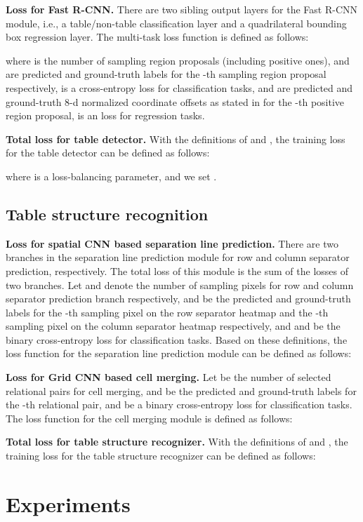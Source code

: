 \documentclass[final,3p,times,twocolumn]{elsarticle}
\begin{document}
\textbf{Loss for Fast R-CNN.} There are two sibling output layers for the Fast R-CNN module, i.e., a table/non-table classification layer and a quadrilateral bounding box regression layer. The multi-task loss function is defined as follows: 

where  is the number of sampling region proposals (including  positive ones),  and  are predicted and ground-truth labels for the -th sampling region proposal respectively,  is a cross-entropy loss for classification tasks,  and  are predicted and ground-truth 8-d normalized coordinate offsets as stated in \cite{zhong2019anchor} for the -th positive region proposal,  is an  loss for regression tasks.

\textbf{Total loss for table detector.} With the definitions of  and , the training loss for the table detector can be defined as follows:

where  is a loss-balancing parameter, and we set .

\subsection{Table structure recognition}
\textbf{Loss for spatial CNN based separation line prediction.} There are two branches in the separation line prediction module for row and column separator prediction, respectively. The total loss of this module is the sum of the losses of two branches. Let  and  denote the number of sampling pixels for row and column separator prediction branch respectively,  and  be the predicted and ground-truth labels for the -th sampling pixel on the row separator heatmap and the -th sampling pixel on the column separator heatmap respectively, and  and  be the binary cross-entropy loss for classification tasks. Based on these definitions, the loss function for the separation line prediction module can be defined as follows:


\textbf{Loss for Grid CNN based cell merging.} Let  be the number of selected relational pairs for cell merging,  and  be the predicted and ground-truth labels for the -th relational pair, and  be a binary cross-entropy loss for classification tasks. The loss function for the cell merging module is defined as follows:


\textbf{Total loss for table structure recognizer.} With the definitions of  and , the training loss for the table structure recognizer can be defined as follows:


\section{Experiments}
\label{sec:exps}
\end{document}
